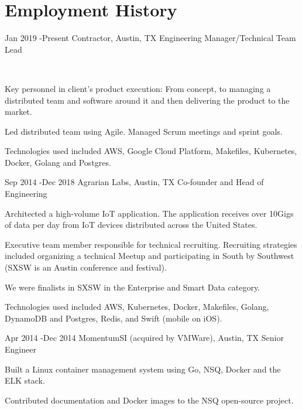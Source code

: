 \documentclass[10pt]{article} %
\begin{document}

\section{Employment History}

\job
{Jan 2019 -}{Present}
{Contractor, Austin, TX}
{}
{Engineering Manager/Technical Team Lead}
{\\

\begin{itemize-noindent}
\item{Key personnel in client's product execution: From concept, to managing a distributed team and software around it and then delivering the product to the market.}
\item{Led distributed team using Agile. Managed Scrum meetings and sprint goals.}
\item{Technologies used included AWS, Google Cloud Platform, Makefiles, Kubernetes, Docker, Golang and Postgres.}
\end{itemize-noindent}
}


\job
{Sep 2014 -}{Dec 2018}
{Agrarian Labs, Austin, TX}
{}
{Co-founder and Head of Engineering}
{

\begin{itemize-noindent}
\item{Architected a high-volume IoT application.  The application receives over 10Gigs of data per day from IoT devices distributed across the United States.}
\item{Executive team member responsible for technical recruiting. Recruiting strategies included organizing a technical Meetup and participating in South by Southwest (SXSW is an Austin conference and festival).}
\item{We were finalists in SXSW in the Enterprise and Smart Data category.}
\item{Technologies used included AWS, Kubernetes, Docker, Makefiles, Golang, DynamoDB and Postgres, Redis, and Swift (mobile on iOS).}
\end{itemize-noindent}
}


\job
{Apr 2014 -}{Dec 2014}
{MomentumSI (acquired by VMWare), Austin, TX}
{}
{Senior Engineer}
{
\begin{itemize-noindent}
\item{Built a Linux container management system using Go, NSQ, Docker and the ELK stack.}
\item{Contributed documentation and Docker images to the NSQ open-source project.}
\end{itemize-noindent}
}
\end{document}
